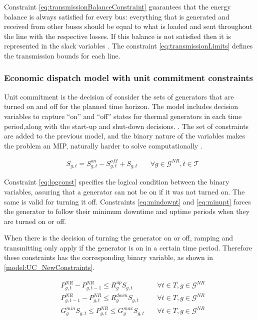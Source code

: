 \documentclass[12pt,LUDisStyle,twosided]{book}
\newcommand{\mc}{\mathcal}
\begin{document}
Constraint \ref{eq:transmissionBalanceConstraint} guarantees that the energy balance is always satisfied for every bus: everything that is generated and received from other buses should be equal to what is loaded and sent throughout the line with the respective losses. If this balance is not satisfied then it is represented in the slack variables . The constraint \ref{eq:transmissionLimits} defines the transmission bounds for each line.

\subsubsection{Economic dispatch model with unit commitment constraints}
Unit commitment is the decision of consider the sets of generators that are turned on and off for the planned time horizon. The model includes decision variables to capture ``on'' and ``off'' states for thermal generators in each time period,along with the start-up and shut-down decisions. \citep{palmintier}. The set of constraints are added to the previous model, and the binary nature of the variables makes the problem an MIP, naturally harder to solve computationally \cite{james}. 

\begin{subequations}\label{model:ucConstraints}
\begin{alignat}{4}
& S_{g,t} = S^{on}_{g,t} - S^{off}_{g,t} + S_{g,t}  &~& \forall g \in \mc{G}^{NR} , t \in \mc{T} \label{eq:logconst}\end{alignat} 
\end{subequations}

Constraint \ref{eq:logconst} specifies the logical condition between the binary variables, assuring that a generator can not be on if it was not turned on. The same is valid for turning it off. Constraints \ref{eq:mindownt} and \ref{eq:minupt} forces the generator to follow their minimum downtime and uptime periods when they are turned on or off. 

When there is the decision of turning the generator on or off, ramping and transmitting only apply if the generator is on in a certain time period. Therefore these constraints has the corresponding binary variable, as shown in \ref{model:UC_NewConstraints}.

\begin{subequations}\label{model:UC_NewConstraints}
\begin{alignat}{4}
& P^{NR}_{g,t} - P^{NR}_{g,t - 1} \leq R^{up}_{g} S_{g,t} &~& \forall t \in T, g \in \mc{G}^{NR}\label{eq:UCrampUpRateConstraint} \\
& P^{NR}_{g,t -1 } - P^{NR}_{g,t} \leq R^{down}_{g} S_{g,t} &~& \forall t \in T, g \in \mc{G}^{NR}\label{eq:UCrampDownRateConstraint} \\
& G^{min}_{g} S_{g,t}\leq P^{NR}_{g,t} \leq G^{max}_{g} S_{g,t} &~& \forall t \in T, g \in \mc{G}^{NR}\label{eq:UCgenerationBounds}
\end{alignat} 
\end{subequations}
 
\end{document}
